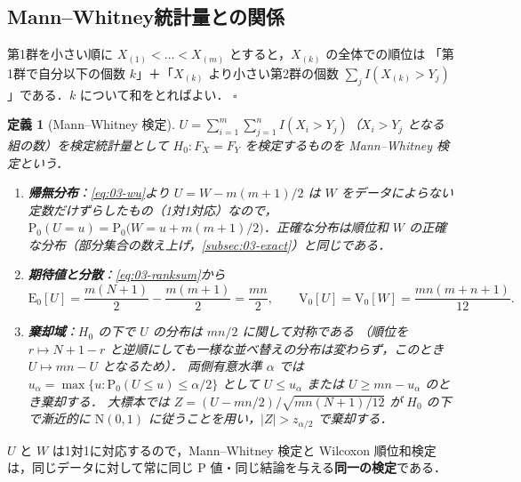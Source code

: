 \documentclass[a4paper,11pt,openany]{ltjsbook}
\newtheorem{teigi}{定義}[chapter]
\newtheorem{meidai}[teigi]{命題}
\newenvironment{proof}[1][証明]{\par\smallskip\noindent{\sffamily\bfseries #1}\quad\ignorespaces}{\nobreak\hfill$\square$\par\medskip}
\newcommand{\E}{\mathrm{E}}
\newcommand{\V}{\mathrm{V}}
\newcommand{\Prob}{\mathrm{P}}
\newcommand{\Normal}{\mathrm{N}}
\begin{document}
\subsection{Mann--Whitney統計量との関係}\label{subsec:03-mw}
\begin{proof}
第1群を小さい順に $X_{(1)}<\dots<X_{(m)}$ とすると，$X_{(k)}$ の全体での順位は
「第1群で自分以下の個数 $k$」＋「$X_{(k)}$ より小さい第2群の個数 $\sum_jI(X_{(k)}>Y_j)$」である．$k$ について和をとればよい．
\end{proof}
\begin{teigi}[Mann--Whitney 検定]\label{def:03-mwtest}
$U=\sum_{i=1}^m\sum_{j=1}^nI(X_i>Y_j)$（$X_i>Y_j$ となる組の数）を検定統計量として $H_0:F_X=F_Y$ を検定するものを Mann--Whitney 検定という．
\begin{enumerate}[label=(\roman*)]
\item \textbf{帰無分布}：\cref{eq:03-wu}より $U=W-m(m+1)/2$ は $W$ をデータによらない定数だけずらしたもの（1対1対応）なので，
      $\Prob_0(U=u)=\Prob_0\bigl(W=u+m(m+1)/2\bigr)$．正確な分布は順位和 $W$ の正確な分布（部分集合の数え上げ，\cref{subsec:03-exact}）と同じである．
\item \textbf{期待値と分散}：\cref{eq:03-ranksum}から
      \begin{equation}
      \E_0[U]=\frac{m(N+1)}{2}-\frac{m(m+1)}{2}=\frac{mn}{2},\qquad \V_0[U]=\V_0[W]=\frac{mn(m+n+1)}{12}.\label{eq:03-umoments}
      \end{equation}
\item \textbf{棄却域}：$H_0$ の下で $U$ の分布は $mn/2$ に関して対称である
      （順位を $r\mapsto N+1-r$ と逆順にしても一様な並べ替えの分布は変わらず，このとき $U\mapsto mn-U$ となるため）．
      両側有意水準 $\alpha$ では $u_\alpha=\max\{u:\Prob_0(U\le u)\le\alpha/2\}$ として
      $U\le u_\alpha$ または $U\ge mn-u_\alpha$ のとき棄却する．
      大標本では $Z=(U-mn/2)/\sqrt{mn(N+1)/12}$ が $H_0$ の下で漸近的に $\Normal(0,1)$ に従うことを用い，$|Z|>z_{\alpha/2}$ で棄却する．
\end{enumerate}
\end{teigi}
$U$ と $W$ は1対1に対応するので，Mann--Whitney 検定と Wilcoxon 順位和検定は，同じデータに対して常に同じ P 値・同じ結論を与える\textbf{同一の検定}である．
\end{document}
